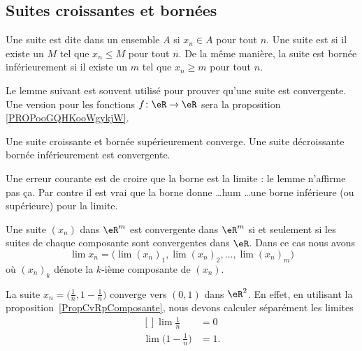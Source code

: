 \subsection{Suites croissantes et bornées}

Une suite est dite  dans un ensemble $A$ si $x_n\in A$ pour tout $n$. Une suite est  si il existe un $M$ tel que $x_n\leq M$ pour tout $n$. De la même manière, la suite est bornée inférieurement si il existe un $m$ tel que $x_n\geq m$ pour tout $n$.

Le lemme suivant est souvent utilisé pour prouver qu'une suite est convergente. Une version pour les fonctions \( f\colon \eR\to \eR\) sera la proposition \ref{PROPooGQHKooWgykjW}.
\begin{lemma}		\label{LemSuiteCrBorncv}
	Une suite croissante et bornée supérieurement converge. Une suite décroissante bornée inférieurement est convergente.
\end{lemma}

Une erreur courante est de croire que la borne est la limite : le lemme n'affirme pas ça. Par contre il est vrai que la borne donne \ldots hum \ldots une borne inférieure (ou supérieure) pour la limite.

\begin{proposition}		\label{PropCvRpComposante}
	Une suite $(x_n)$ dans $\eR^m$ est convergente dans $\eR^m$ si et seulement si les suites de chaque composante sont convergentes dans $\eR$. Dans ce cas nous avons
	 \begin{equation}
		 \lim x_n=\Big( \lim(x_n)_1,\lim (x_n)_2,\ldots,\lim (x_n)_m \Big)
	 \end{equation}
	 où $(x_n)_k$ dénote la $k$-ième composante de $(x_n)$.
\end{proposition}

\begin{example}
	La suite $x_n=\big( \frac{1}{ n },1-\frac{1}{ n } \big)$ converge vers $(0,1)$ dans $\eR^2$. En effet, en utilisant la proposition~\ref{PropCvRpComposante}, nous devons calculer séparément les limites
	\begin{equation}
		\begin{aligned}[]
			\lim\frac{1}{ n }&=0\\
			\lim\big( 1-\frac{1}{ n } \big)&=1.
		\end{aligned}
	\end{equation}
\end{example}

